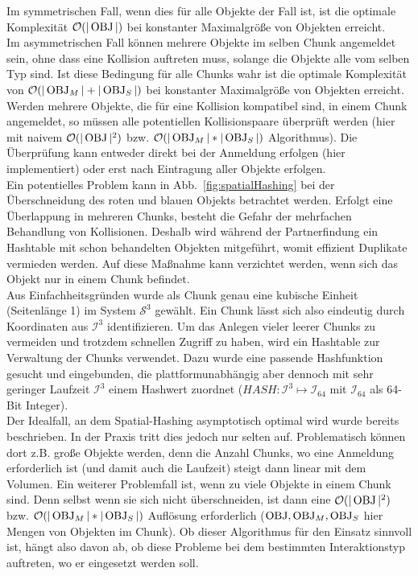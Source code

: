 Im symmetrischen Fall, wenn dies für alle Objekte der Fall ist, ist die optimale Komplexität $\mathcal{O}(|\operatorname{OBJ}|)$  bei konstanter Maximalgröße von Objekten erreicht.\\
Im asymmetrischen Fall können mehrere Objekte im selben Chunk angemeldet sein, ohne dass eine Kollision auftreten muss, solange die Objekte alle vom selben Typ sind. Ist diese Bedingung für alle Chunks wahr ist die optimale Komplexität von $\mathcal{O}(|\operatorname{OBJ}_M|+|\operatorname{OBJ}_S|)$ bei konstanter Maximalgröße von Objekten erreicht. \\
Werden mehrere Objekte, die für eine Kollision kompatibel sind, in einem Chunk angemeldet, so müssen alle potentiellen Kollisionspaare überprüft werden (hier mit naivem $\mathcal{O}(|\operatorname{OBJ}|^2)$ bzw. $\mathcal{O}(|\operatorname{OBJ}_M|*|\operatorname{OBJ}_S|)$ Algorithmus). Die Überprüfung kann entweder direkt bei der Anmeldung erfolgen (hier implementiert) oder erst nach Eintragung aller Objekte erfolgen.\\
Ein potentielles Problem kann in Abb.~\ref{fig:spatialHashing} bei der Überschneidung des roten und blauen Objekts betrachtet werden. Erfolgt eine Überlappung in mehreren Chunks, besteht die Gefahr der mehrfachen Behandlung von Kollisionen. Deshalb wird während der Partnerfindung ein Hashtable mit schon behandelten Objekten mitgeführt, womit effizient Duplikate vermieden werden. Auf diese Maßnahme kann verzichtet werden, wenn sich das Objekt nur in einem Chunk befindet.\\
Aus Einfachheitsgründen wurde als Chunk genau eine kubische Einheit (Seitenlänge 1) im System $\mathcal{S}^3$ gewählt. Ein Chunk lässt sich also eindeutig durch Koordinaten aus $\mathcal{I}^3$ identifizieren. Um das Anlegen vieler leerer Chunks zu vermeiden und trotzdem schnellen Zugriff zu haben, wird ein Hashtable zur Verwaltung der Chunks verwendet. Dazu wurde eine passende Hashfunktion gesucht und eingebunden, die plattformunabhängig aber dennoch mit sehr geringer Laufzeit $\mathcal{I}^3$ einem Hashwert zuordnet ($HASH: \mathcal{I}^3 \mapsto \mathcal{I}_{64}$ mit $\mathcal{I}_{64}$ als 64-Bit Integer).\\
Der Idealfall, an dem Spatial-Hashing asymptotisch optimal wird wurde bereits beschrieben. In der Praxis tritt dies jedoch nur selten auf. Problematisch können dort z.B. große Objekte werden, denn die Anzahl Chunks, wo eine Anmeldung erforderlich ist (und damit auch die Laufzeit) steigt dann linear mit dem Volumen. Ein weiterer Problemfall ist, wenn zu viele Objekte in einem Chunk sind. Denn selbst wenn sie sich nicht überschneiden, ist dann eine $\mathcal{O}(|\operatorname{OBJ}|^2)$ bzw. $\mathcal{O}(|\operatorname{OBJ}_M|*|\operatorname{OBJ}_S|)$ Auflösung erforderlich ($\operatorname{OBJ}, \operatorname{OBJ}_M, \operatorname{OBJ}_S$ hier Mengen von Objekten im Chunk). Ob dieser Algorithmus für den Einsatz sinnvoll ist, hängt also davon ab, ob diese Probleme bei dem bestimmten Interaktionstyp auftreten, wo er eingesetzt werden soll.\\


